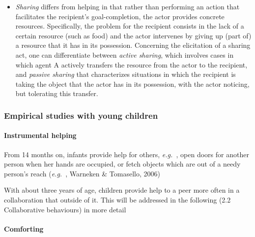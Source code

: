 \documentclass{article}
\newcommand{\eg}{{\textit{e.g.~}}}
\begin{document}
\begin{itemize}
\item \textit{Sharing} differs from helping in that rather than performing an
action that facilitates the recipient's goal-completion, the actor provides
concrete resources. Specifically, the problem for the recipient consists in the
lack of a certain resource (such as food) and the actor intervenes by giving up
(part of) a resource that it has in its possession. Concerning the
elicitation of a sharing act, one can differentiate between \emph{active
sharing}, which involves cases in which agent A actively transfers the resource
from the actor to the recipient, and \emph{passive sharing} that characterizes
situations in which the recipient is taking the object that the actor has in
its possession, with the actor noticing, but tolerating this transfer. 

\end{itemize}


\subsubsection{Empirical studies with young children}


\paragraph{Instrumental helping}

From 14 months on, infants provide help for others, \eg, open doors for
another person when her hands are occupied, or fetch objects which are out of a
needy person's reach (\eg, Warneken \& Tomasello, 2006)

With about three years of age, children provide help to a peer more often
in a collaboration that outside of it.  This will be addressed in the following
(2.2 Collaborative behaviours) in more detail

\paragraph{Comforting}
\end{document}
